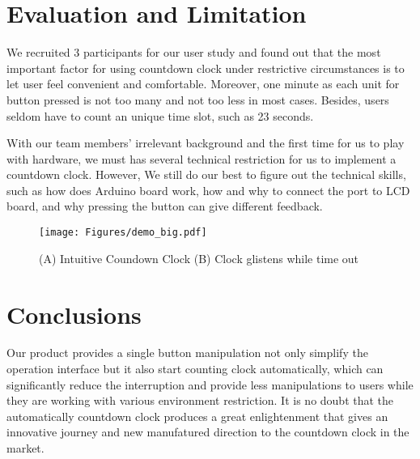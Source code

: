 \documentclass{sig-alternate-ipsn13}
\begin{document}

\section{Evaluation and Limitation}
We recruited 3 participants for our user study and found out that the most important factor for using countdown clock under restrictive circumstances is to let user feel convenient and comfortable. Moreover, one minute as each unit for button pressed is not too many and not too less in most cases. Besides, users seldom have to count an unique time slot, such as 23 seconds.

With our team members' irrelevant background and the first time for us to play with hardware, we must has several technical restriction for us to implement a countdown clock. However, We still do our best to figure out the technical skills, such as how does Arduino board work, how and why to connect the port to LCD board, and why pressing the button can give different feedback.


\begin{figure}
  \centering
  \texttt{[image: Figures/demo\_big.pdf]}
  \caption{(A) Intuitive Coundown Clock (B) Clock glistens while time out}
  \label{fig:demo1}
\end{figure}

\section{Conclusions}
Our product provides a single button manipulation not only simplify the operation interface but it also start counting clock automatically, which can significantly reduce the interruption and provide less manipulations to users while they are working with various environment restriction.
It is no doubt that the automatically countdown clock produces a great enlightenment that gives an innovative journey and new manufatured direction to the countdown clock in the market.
\end{document}
